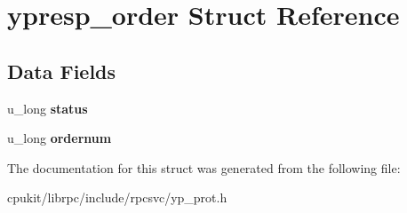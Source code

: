 \hypertarget{structypresp__order}{}\section{ypresp\+\_\+order Struct Reference}
\label{structypresp__order}
\subsection*{Data Fields}
\begin{DoxyCompactItemize}
\item 
\mbox{\label{structypresp__order_a964a396ea517ecbab4999b3d000d5b0d}} 
u\+\_\+long {\bfseries status}
\item 
\mbox{\label{structypresp__order_af6250d2cbfa1f35ccb9ed7ae7f2bee0f}} 
u\+\_\+long {\bfseries ordernum}
\end{DoxyCompactItemize}


The documentation for this struct was generated from the following file\+:\begin{DoxyCompactItemize}
\item 
cpukit/librpc/include/rpcsvc/yp\+\_\+prot.\+h\end{DoxyCompactItemize}
